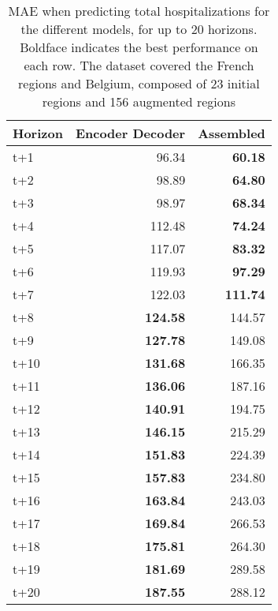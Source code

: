 \begin{table}[H]
\centering
\caption{MAE when predicting total hospitalizations for the different models, for up to 20 horizons. Boldface indicates the best performance on each row. The dataset covered the French regions and Belgium, composed of 23 initial regions and 156 augmented regions }
\label{tab:MAE_comparison}
\begin{tabular}{lrr}
\toprule
Horizon &  Encoder Decoder &  Assembled \\
\midrule
t+1  & 96.34  & \textbf{60.18}  \\
t+2  & 98.89  & \textbf{64.80}  \\
t+3  & 98.97  & \textbf{68.34}  \\
t+4  & 112.48  & \textbf{74.24}  \\
t+5  & 117.07  & \textbf{83.32}  \\
t+6  & 119.93  & \textbf{97.29}  \\
t+7  & 122.03  & \textbf{111.74}  \\
t+8  & \textbf{124.58}  & 144.57  \\
t+9  & \textbf{127.78}  & 149.08  \\
t+10  & \textbf{131.68}  & 166.35  \\
t+11  & \textbf{136.06}  & 187.16  \\
t+12  & \textbf{140.91}  & 194.75  \\
t+13  & \textbf{146.15}  & 215.29  \\
t+14  & \textbf{151.83}  & 224.39  \\
t+15  & \textbf{157.83}  & 234.80  \\
t+16  & \textbf{163.84}  & 243.03  \\
t+17  & \textbf{169.84}  & 266.53  \\
t+18  & \textbf{175.81}  & 264.30  \\
t+19  & \textbf{181.69}  & 289.58  \\
t+20  & \textbf{187.55}  & 288.12  \\

\bottomrule
\end{tabular}
\end{table}
